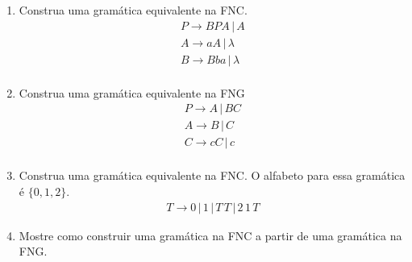 \documentclass[a4paper]{article}
\theoremstyle{definition}
\begin{document}
  \begin{enumerate}
     \item Construa uma gramática equivalente na FNC.
       \[
         \begin{array}{l}
           P \to BPA \,|\,A \\
           A \to aA \,|\, \lambda\\
           B \to Bba \,|\,\lambda\\
         \end{array}
       \]
     \item Construa uma gramática equivalente na FNG
       \[
         \begin{array}{l}
           P \to A \,|\,BC\\
           A \to B \,|\, C\\
           C \to cC \,|\, c\\
         \end{array}
       \]
     \item Construa uma gramática equivalente na FNC.
       O alfabeto para essa gramática é $\{0,1,2\}$.
       \[
         \begin{array}{l}
           T \to 0\, |\, 1 \,|\, T\,T\,|\,2\,1\,T 
         \end{array}
       \]
     \item Mostre como construir uma gramática na FNC a partir de uma gramática
       na FNG.
  \end{enumerate}
\end{document}
